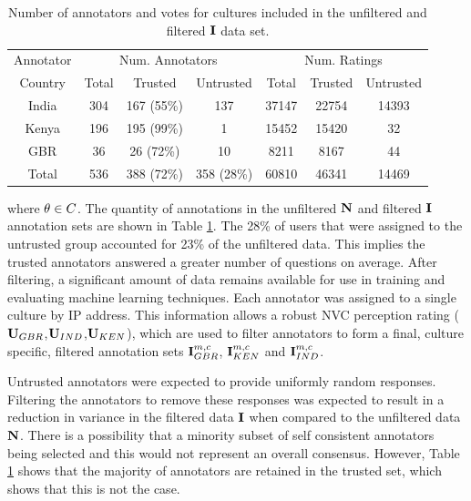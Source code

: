 \begin{table}
\centering
\caption{Number of annotators and votes for cultures included in the unfiltered and filtered $\textbf{I}$ data set.}
\begin{tabular}{ | c || c | c  c || c | c  c | }
\hline
Annotator & \multicolumn{3}{c||}{Num. Annotators} & \multicolumn{3}{c|}{Num. Ratings}  \\
Country & Total & Trusted & Untrusted & Total & Trusted & Untrusted \\
\hline
\hline
India & 304 & 167 (55\%) & 137 & 37147 & 22754 & 14393\\
Kenya & 196 & 195 (99\%) & 1   & 15452 & 15420 & 32\\
GBR   & 36  & 26  (72\%) & 10  & 8211  & 8167  & 44\\
\hline
Total & 536 & 388 (72\%) & 358 (28\%) & 60810 & 46341 & 14469\\

\hline
\end{tabular}
\label{NumFilteredWorkersTable}
\end{table}

where $\theta \in C$. The quantity of annotations in the unfiltered $\textbf{N}$ and filtered $\textbf{I}$ annotation sets are shown in Table \ref{NumFilteredWorkersTable}. The 28\% of users that were assigned to the untrusted group accounted for 23\% of the unfiltered data. This implies the trusted annotators answered a greater number of questions on average. After filtering, a significant amount of data remains available for use in training and evaluating machine learning techniques. Each annotator was assigned to a single culture by \ac{IP} address. This information allows a \culturallySpecific robust \ac{NVC} perception rating ($\textbf{U}_{GBR}$,$\textbf{U}_{IND}$,$\textbf{U}_{KEN}$), which are used to filter annotators to form a final, culture specific, filtered annotation sets $\textbf{I}^{m, c}_{GBR}$, $\textbf{I}^{m, c}_{KEN}$ and $\textbf{I}^{m, c}_{IND}$.


Untrusted annotators were expected to provide uniformly random responses. Filtering the annotators to remove these responses was expected to result in a reduction in variance in the filtered data $\textbf{I}$ when compared to the unfiltered data $\textbf{N}$. There is a possibility that a minority subset of self consistent annotators being selected and this would not represent an overall consensus. However, Table \ref{NumFilteredWorkersTable} shows that the majority of annotators are retained in the trusted set, which shows that this is not the case.

